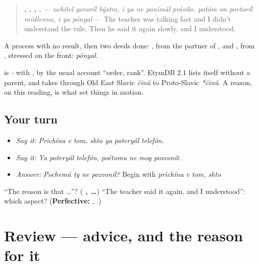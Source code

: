 \begin{culture}
\begin{quote}
\textbf{  ,     .    ,   .} — \emph{uchítel govoríl býstro, i ya ne ponimál právilo. potóm on povtoríl médlenno, i ya pónyal} — The teacher was talking fast and I didn't understand the rule. Then he said it again slowly, and I understood.
\end{quote}

A process with no result, then two deeds done: \textbf{}, from the partner of \emph{}, and \textbf{}, from \emph{}, stressed on the front: \emph{pónyal}.
\end{culture}

\begin{cousinweb}
\textbf{} is \emph{-} with \textbf{}, by the usual account \textquotedblleft{}order, rank\textquotedblright{}. EtymDB 2.1 lists \emph{} itself without a parent, and takes \emph{} through Old East Slavic \emph{činŭ} to Proto-Slavic \emph{*činŭ}. A reason, on this reading, is what set things in motion.
\end{cousinweb}

\subsection*{Your turn}
\begin{itemize}
\raggedright
  \item \emph{Say it:} \emph{Prichína v tom, shto ya poteryál telefón.}
  \item \emph{Say it:} \emph{Ya poteryál telefón, poétomu ne mog pozvonít.}
  \item \emph{Answer:} \emph{Pochemú ty ne pozvoníl?} Begin with \emph{prichína v tom, shto}
\end{itemize}

\begin{tcolorbox}[breakable,colback=teal!4,colframe=teal!35!black,title={Before you move on}]
\textquotedblleft{}The reason is that …\textquotedblright{}? (\emph{\textbf{  ,  …}}) \textquotedblleft{}The teacher said it again, and I understood\textquotedblright{}: which aspect? (\textbf{Perfective:} \emph{\textbf{}}, \emph{\textbf{}}.)
\end{tcolorbox}
\section[(review)]{Review — advice, and the reason for it}

